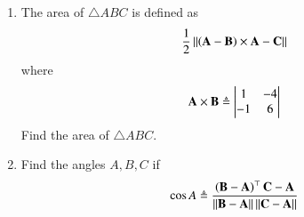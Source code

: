 \begin{enumerate}[label=\thesection.\arabic*.,ref=\thesection.\theenumi]

\item The area of $\triangle ABC$ is defined as
		\begin{align}
			\frac{1}{2}\left\lVert{\ensuremath{\left(\mathbf{A}-\mathbf{B}\right)}\times {\mathbf{A}-\mathbf{C}}}\right\rVert
		\end{align}
		where
		\begin{align}
			\mathbf{A}\times\mathbf{B} \triangleq \begin{vmatrix}1 & -4 \\-1 & 6\end{vmatrix}
		\end{align}
		Find the area of $\triangle ABC$.\\
  		
	\item Find the angles $A, B, C$ if 
    \label{prop:angle2d}
  \begin{align}
    \label{eq:angle2d}
			\cos A \triangleq 
\frac{\left(\mathbf{B}-\mathbf{A}\right)^{\top}{\mathbf{C}-\mathbf{A}}}{\left\lVert\mathbf{B}-\mathbf{A}\right\rVert\left\lVert\mathbf{C}-\mathbf{A}\right\rVert}
  \end{align}\\
  	
\end{enumerate}

